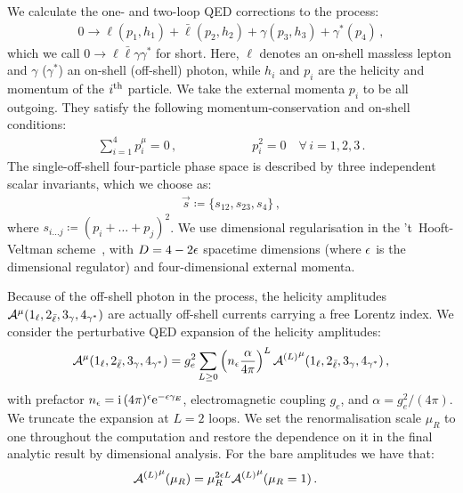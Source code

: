 \documentclass[main.tex]{subfiles}
\begin{document}
We calculate the one- and two-loop QED corrections to the process:
\begin{align}
    \label{eqQED:scatter}
    0 \to \ell(p_1,h_1) + \bar{\ell}(p_2,h_2) + \gamma(p_3,h_3) + \gamma^{*}(p_4) \,,
\end{align}
which we call $0\to \ell \bar\ell \gamma \gamma^*$ for short. 
Here, $\ell$ denotes an on-shell massless lepton and $\gamma$ ($\gamma^*$) an on-shell (off-shell) photon, while $h_i$ and $p_i$ are the helicity and momentum of the $i\textsuperscript{th}$ particle.
We take the external momenta $p_i$ to be all outgoing. They satisfy the following momentum-conservation and on-shell conditions:
\begin{align}
    \sum_{i=1}^{4} p_i^\mu = 0 \,, \qquad \qquad \qquad p_i^2 = 0 \quad \forall \, i=1,2,3\,.
\end{align}
The single-off-shell four-particle phase space is described by three independent scalar invariants, which we choose as:
\begin{align}
    \vec{s} \coloneqq \{s_{12}, s_{23}, s_4\} \,,
\end{align}
where $s_{i\ldots j} \coloneqq (p_i+\ldots+p_j)^2$.
We use dimensional regularisation in the 't~Hooft-Veltman scheme~\cite{Gnendiger:2017pys}, with $D=4-2\epsilon$ spacetime dimensions (where $\epsilon$ is the dimensional regulator) and four-dimensional external momenta.

Because of the off-shell photon in the process, the helicity amplitudes $\mathcal{A}^{\mu}(1_\ell,2_{\bar\ell},3_\gamma,4_{\gamma^*})$ are actually off-shell currents carrying a free Lorentz index.
We consider the perturbative QED expansion of the helicity amplitudes:
\begin{align} \label{eqQED:loopdecomp}
    \mathcal{A}^{\mu}(1_\ell,2_{\bar\ell},3_\gamma,4_{\gamma^*}) = g_e^2 \sum_{L\ge 0} \left( n_\epsilon \frac{\alpha}{4\pi} \right)^L {\mathcal{A}^{(L)}}^{\mu}(1_\ell,2_{\bar\ell},3_\gamma,4_{\gamma^*}) \,,
\end{align}
with prefactor $n_\epsilon=\mathrm{i}\, (4\pi)^\epsilon \mathrm{e}^{-\epsilon\gamma_E}$, electromagnetic coupling $g_e$, and $\alpha=g_e^2/(4\pi)$.
We truncate the expansion at $L=2$ loops.
We set the renormalisation scale $\mu_R$ to one throughout the computation and restore the dependence on it in the final analytic result by dimensional analysis. For the bare amplitudes we have that:
\begin{align}
    \label{eqQED:scale-restoration}
    {\mathcal{A}^{(L)}}^{\mu}(\mu_R) &= \mu_R^{2\epsilon L} {\mathcal{A}^{(L)}}^{\mu}(\mu_R=1) \,.
\end{align}
\end{document}
